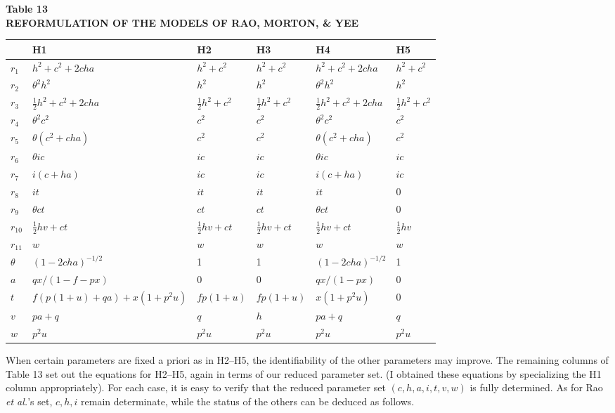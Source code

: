 ﻿\documentclass[12pt]{article}
\begin{document}
\begin{center}
\textbf{Table 13}\\
\textbf{REFORMULATION OF THE MODELS OF RAO, MORTON, \& YEE}
\end{center}
\begin{center}
\footnotesize
\begin{tabular}{l l l l l l}
\hline
 & H1 & H2 & H3 & H4 & H5 \\
\hline
$r_1$ & $h^2+c^2+2cha$ & $h^2+c^2$ & $h^2+c^2$ & $h^2+c^2+2cha$ & $h^2+c^2$ \\
$r_2$ & $\theta^2h^2$ & $h^2$ & $h^2$ & $\theta^2h^2$ & $h^2$ \\
$r_3$ & $\tfrac12h^2+c^2+2cha$ & $\tfrac12h^2+c^2$ & $\tfrac12h^2+c^2$ & $\tfrac12h^2+c^2+2cha$ & $\tfrac12h^2+c^2$ \\
$r_4$ & $\theta^2c^2$ & $c^2$ & $c^2$ & $\theta^2c^2$ & $c^2$ \\
$r_5$ & $\theta(c^2+cha)$ & $c^2$ & $c^2$ & $\theta(c^2+cha)$ & $c^2$ \\
$r_6$ & $\theta ic$ & $ic$ & $ic$ & $\theta ic$ & $ic$ \\
$r_7$ & $i(c+ha)$ & $ic$ & $ic$ & $i(c+ha)$ & $ic$ \\
$r_8$ & $it$ & $it$ & $it$ & $it$ & $0$ \\
$r_9$ & $\theta ct$ & $ct$ & $ct$ & $\theta ct$ & $0$ \\
$r_{10}$ & $\tfrac12hv+ct$ & $\tfrac12hv+ct$ & $\tfrac12hv+ct$ & $\tfrac12hv+ct$ & $\tfrac12hv$ \\
$r_{11}$ & $w$ & $w$ & $w$ & $w$ & $w$ \\
\hline
$\theta$ & $(1-2cha)^{-1/2}$ & 1 & 1 & $(1-2cha)^{-1/2}$ & 1 \\
$a$ & $qx/(1-f-px)$ & 0 & 0 & $qx/(1-px)$ & 0 \\
$t$ & $f(p(1+u)+qa)+x(1+p^2u)$ & $fp(1+u)$ & $fp(1+u)$ & $x(1+p^2u)$ & 0 \\
$v$ & $pa+q$ & $q$ & $h$ & $pa+q$ & $q$ \\
$w$ & $p^2u$ & $p^2u$ & $p^2u$ & $p^2u$ & $p^2u$ \\
\hline
\end{tabular}
\end{center}

When certain parameters are fixed a priori as in H2--H5, the identifiability of the other parameters may improve. The remaining columns of Table 13 set out the equations for H2--H5, again in terms of our reduced parameter set. (I obtained these equations by specializing the H1 column appropriately). For each case, it is easy to verify that the reduced parameter set $(c,h,a,i,t,v,w)$ is fully determined. As for Rao \emph{et al.}'s set, $c,h,i$ remain determinate, while the status of the others can be deduced as follows.
\end{document}
